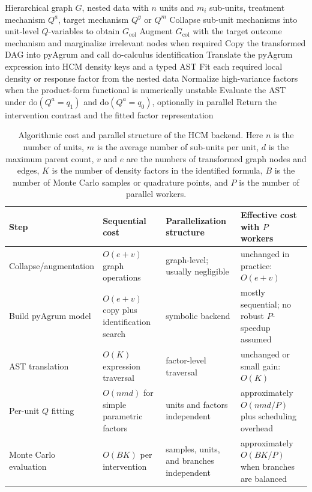 \documentclass[unnumsec,webpdf,contemporary,large]{oup-authoring-template}%
\theoremstyle{thmstyleone}%
\theoremstyle{thmstyletwo}%
\theoremstyle{thmstylethree}%
\newcommand{\rmdo}{\mathrm{do}}
\newcommand{\col}{\mathrm{col}}
\begin{document}
\begin{algorithm}[!htbp]
\caption{Automatic HCM identification and plug-in evaluation}
\label{alg:hcm-pipeline}
\begin{algorithmic}[1]
\Require Hierarchical graph $G$, nested data with $n$ units and $m_i$ sub-units, treatment mechanism $Q^a$, target mechanism $Q^y$ or $Q^m$
\State Collapse sub-unit mechanisms into unit-level $Q$-variables to obtain $G_{\col}$
\State Augment $G_{\col}$ with the target outcome mechanism and marginalize irrelevant nodes when required
\State Copy the transformed DAG into pyAgrum and call do-calculus identification
\State Translate the pyAgrum expression into HCM density keys and a typed AST
\State Fit each required local density or response factor from the nested data
\State Normalize high-variance factors when the product-form functional is numerically unstable
\State Evaluate the AST under $\rmdo(Q^a=q_1)$ and $\rmdo(Q^a=q_0)$, optionally in parallel
\State Return the intervention contrast and the fitted factor representation
\end{algorithmic}
\end{algorithm}

\begin{table}[!htbp]
\centering
\small
\caption{Algorithmic cost and parallel structure of the HCM backend. Here $n$ is the number of units, $m$ is the average number of sub-units per unit, $d$ is the maximum parent count, $v$ and $e$ are the numbers of transformed graph nodes and edges, $K$ is the number of density factors in the identified formula, $B$ is the number of Monte Carlo samples or quadrature points, and $P$ is the number of parallel workers.}
\label{tab:complexity}
\begin{tabular}{p{}p{}p{}p{}}
\toprule
Step & Sequential cost & Parallelization structure & Effective cost with $P$ workers \\
\midrule
Collapse/augmentation & $O(e+v)$ graph operations & graph-level; usually negligible & unchanged in practice: $O(e+v)$ \\
Build pyAgrum model & $O(e+v)$ copy plus identification search & symbolic backend & mostly sequential; no robust $P$-speedup assumed \\
AST translation & $O(K)$ expression traversal & factor-level traversal & unchanged or small gain: $O(K)$ \\
Per-unit $Q$ fitting & $O(nmd)$ for simple parametric factors & units and factors independent & approximately $O(nmd/P)$ plus scheduling overhead \\
Monte Carlo evaluation & $O(BK)$ per intervention & samples, units, and branches independent & approximately $O(BK/P)$ when branches are balanced \\
\bottomrule
\end{tabular}
\end{table}
\end{document}
